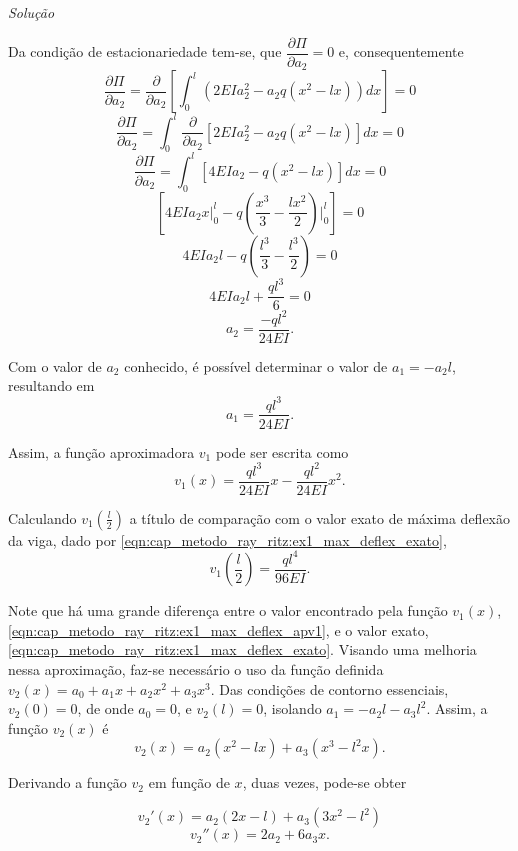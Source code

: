 \documentclass[
	12pt,				%
	openright,			%
    twoside,			%
	a4paper,			%
	chapter=TITLE,		%
	english,			%
	french,				%
	spanish,			%
	brazil				%
	]{abntex2}
\makeatletter
\renewenvironment{proof}[1][\proofname]{
	\par\pushQED{\qed}%
	\normalfont \topsep6\p@\@plus6\p@\relax
	\trivlist
	\item\relax
		{\itshape
			#1\@addpunct{.}}\hspace\labelsep\ignorespaces
}{%
	\popQED\endtrivlist\@endpefalse
}
\newenvironment{solution}{
	\begin{proof}[Solução]
}{%
	\end{proof}
}
\numberwithin{lema}{chapter}
\numberwithin{teorema}{chapter}
\numberwithin{definicao}{chapter}
\numberwithin{exemplo}{chapter}
\numberwithin{figure}{chapter}
\newcommand{\noEquationSpacing}[1]{
	{
		\setlength{\belowdisplayskip}{0pt} \setlength{\belowdisplayshortskip}{0pt}
		\setlength{\abovedisplayskip}{0pt} \setlength{\abovedisplayshortskip}{0pt}
		#1
	}
}
\makeatother
\begin{document}
\begin{solution}
	Da condição de estacionariedade tem-se, que $\dfrac{\partial \Pi}{\partial a_2} = 0$ e, consequentemente
	$$
		\frac{\partial \Pi}{\partial a_2}
		=
		\frac{\partial}{\partial a_2} \left [
			\int_0^l \left ( 2EIa_2 ^2 - a_2 q (x^2 -lx) \right ) dx
		\right]
		= 0
	$$
	$$
		\frac{\partial \Pi}{\partial a_2}
		=
		\int_0^l
			\frac{\partial}{\partial a_2} \left [
			2EIa_2^2 - a_2 q(x^2-lx)
		\right ] dx
		= 0
	$$
	$$
		\frac{\partial \Pi}{\partial a_2}
		=
		\int_0^l \left [
			4EIa_2 - q(x^2-lx)
		\right ] dx
		= 0
	$$
	$$
		\left [ 
			4EIa_2 x \Big |_0^l
			-
			q \left (
				\frac{x^3}{3} - \frac{lx^2}{2}
			\right ) \Big |_0^l
		\right ] 
		= 0
	$$
	$$
		4EIa_2l
		-
		q \left (\frac{l^3}{3} - \frac{l^3}{2} \right )
		= 0
	$$	
	$$
		4EIa_2l+\frac{ql^3}{6} = 0
	$$
	$$
		a_2=\frac{-ql^2}{24EI}\text{.}
	$$

	Com o valor de $a_2$ conhecido, é possível determinar o valor de $a_1=-a_2l$, resultando em
	$$
		a_1=\frac{ql^3}{24EI}
		\text{.}
	$$
	
	Assim, a função aproximadora $v_1$ pode ser escrita como
	$$
		v_1(x)=
		\frac{ql^3}{24EI}x
		-
		\frac{ql^2}{24EI}x^2
		\text{.}
	$$
	
	Calculando $v_1(\frac{l}{2})$ a título de comparação com o valor exato de máxima deflexão da viga, dado por \eqref{eqn:cap_metodo_ray_ritz:ex1_max_deflex_exato},
	\begin{equation}
		\label{eqn:cap_metodo_ray_ritz:ex1_max_deflex_apv1}
		v_1\left (\frac{l}{2} \right) = \frac{ql^4}{96EI}
		\text{.}
	\end{equation}
	
	Note que há uma grande diferença entre o valor encontrado pela função $v_1(x)$, \eqref{eqn:cap_metodo_ray_ritz:ex1_max_deflex_apv1}, e o valor exato, \eqref{eqn:cap_metodo_ray_ritz:ex1_max_deflex_exato}. Visando uma melhoria nessa aproximação, faz-se necessário o uso da função definida $v_2(x)=a_0+a_1x+a_2x^2+a_3x^3$. Das condições de contorno essenciais, $v_2(0)=0$, de onde $a_0=0$, e $v_2(l)=0$, isolando $a_1=-a_2 l - a_3 l^2$. Assim, a função $v_2(x)$ é
	\begin{equation}
		\label{eqn:cap_metodo_ray_ritz:v2_organizada}
		v_2(x)=
		a_2(x^2-lx)
		+
		a_3(x^3-l^2x)
		\text{.}
	\end{equation}
	
	Derivando a função $v_2$ em função de $x$, duas vezes, pode-se obter
	
	\noEquationSpacing
	{
		$$
		v_2'(x) = a_2(2x-l) + a_3(3x^2-l^2)
		$$
		\begin{equation}
			\label{eqn:cap_metodo_ray_ritz:v2_diff_organizada}
			v_2''(x) = 2a_2 + 6a_3 x \text{.}
		\end{equation}
	}
	

\end{solution}
\end{document}
